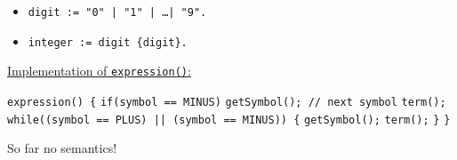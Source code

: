 {{\begin{itemize}
			\item[]{\texttt{digit := "0" | "1" | \ldots | "9".}}
			\item[]{\texttt{integer := digit \{digit\}.}}
		\end{itemize}
	}
	\par{
		\noindent\underline{Implementation of \texttt{expression()}:}
		\par{
			\noindent
			\texttt{expression() \{} \newline
			\indent\texttt{if(symbol == MINUS)} \newline
			\indent\indent\texttt{getSymbol(); // next symbol} \newline
			\indent\texttt{term();} \newline
			\indent\texttt{while((symbol == PLUS) || (symbol == MINUS)) \{} \newline
			\indent\indent\texttt{getSymbol();} \newline
			\indent\indent\texttt{term();} \newline
			\indent\texttt{\}} \newline
			\texttt{\}}
		}
		\par{\noindent So far no semantics!}
	}
}